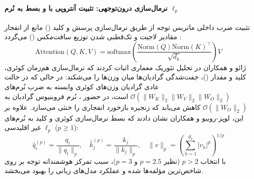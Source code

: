 \paragraph*{نرمال‌سازی درون‌توجهی: تثبیت آنتروپی با  و بسط به نُرم $\ell_p$}
تثبیت ضرب داخلی ماتریس توجه از طریق نرمال‌سازی پرسش و کلید () مانع از انفجار مقادیر لاجیت و تک‌قطبی شدن توزیع سافت‌مکس () می‌گردد \cite{henry2020query, tan2025crystallization}:
\begin{equation}
    \text{Attention}(Q, K, V) = \text{softmax}\left( \frac{\text{Norm}(Q) \text{Norm}(K)^\top}{\sqrt{d_k}} \right) V
\end{equation}
ژائو و همکاران در تحلیل تئوریک معماری  \cite{zhuo2025hybridnorm} اثبات کردند که نرمال‌سازی هم‌زمان کوئری، کلید و مقدار ()، جفت‌شدگی گرادیان‌ها میان وزن‌ها را می‌شکند: در حالی که در حالت عادی گرادیان وزن‌های کوئری وابسته به ضرب نُرم‌های $\mathcal{O}(\|W_K\|_2 \|W_V\|_2 \|W_O\|_2)$ است، در حضور ، نُرم فروبنیوس گرادیان به $\mathcal{O}(\|W_O\|_2)$ کاهش می‌یابد که زنجیره بازخورد انفجاری را خنثی می‌سازد.
علاوه بر این، لوپز-روبیو و همکاران \cite{lopezrubio2026enhanced} نشان دادند که بسط نرمال‌سازی کوئری و کلید به نُرم‌های غیر اقلیدسی $\ell_p$ ($p \ge 1$):
\begin{equation}
    \hat{q}_i^{(p)} = \frac{q_i}{\|q_i\|_p}, \quad \hat{k}_j^{(p)} = \frac{k_j}{\|k_j\|_p}, \quad \|v\|_p = \left( \sum_{h=1}^{d_k} |v_h|^p \right)^{1/p}
\end{equation}
با انتخاب $p > 2$ (نظیر $p=2.5$ و $p=3$)، سبب تمرکز هوشمندانه توجه بر روی شاخص‌ترین مؤلفه‌ها شده و عملکرد مدل‌های زبانی را بهبود می‌بخشد.

